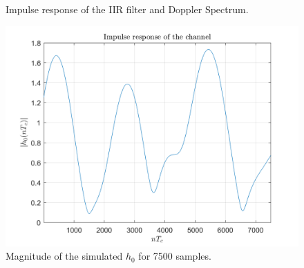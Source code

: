 \documentclass[a4paper, 12pt]{report}
\begin{document}
\begin{figure}[H]
	\centering
	\caption{Impulse response of the IIR filter and Doppler Spectrum.}
	\label{DS}
\end{figure}

\begin{figure}[H]
	\centering
	\includegraphics[width=14cm]{images/h0_7500}
	\caption{Magnitude of the simulated $h_0$ for 7500 samples.}\label{h0_7500}
\end{figure}
\end{document}
